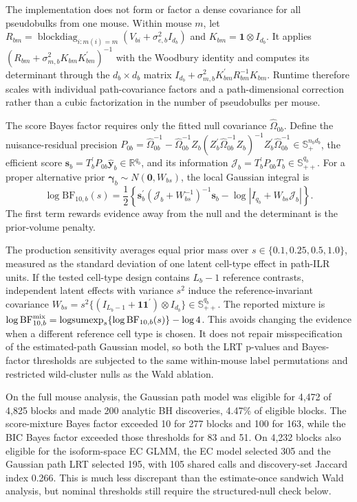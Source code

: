 \documentclass[11pt]{article}
\begin{document}
The implementation does not form or factor a dense covariance for all pseudobulks from one mouse. Within mouse \(m\), let \(R_{bm}=\operatorname{blockdiag}_{i:m(i)=m}(V_{bi}+\sigma_{e,b}^2I_{d_b})\) and \(K_{bm}=\bm1\otimes I_{d_b}\). It applies \((R_{bm}+\sigma_{m,b}^2K_{bm}K_{bm}^\prime)^{-1}\) with the Woodbury identity and computes its determinant through the \(d_b\times d_b\) matrix \(I_{d_b}+\sigma_{m,b}^2K_{bm}^\prime R_{bm}^{-1}K_{bm}\). Runtime therefore scales with individual path-covariance factors and a path-dimensional correction rather than a cubic factorization in the number of pseudobulks per mouse.

The score Bayes factor requires only the fitted null covariance \(\widehat\Omega_{0b}\). Define the nuisance-residual precision \(P_{0b}=\widehat\Omega_{0b}^{-1}-\widehat\Omega_{0b}^{-1}Z_b(Z_b^\prime\widehat\Omega_{0b}^{-1}Z_b)^{-1}Z_b^\prime\widehat\Omega_{0b}^{-1}\in\mathbb S_+^{n_bd_b}\), the efficient score \(\bm s_b=T_b^\prime P_{0b}\widehat{\bm y}_b\in\mathbb R^{q_b}\), and its information \(\mathcal J_b=T_b^\prime P_{0b}T_b\in\mathbb S_{++}^{q_b}\). For a proper alternative prior \(\bm\gamma_b\sim N(\bm0,W_{bs})\), the local Gaussian integral is \[\log\mathrm{BF}_{10,b}(s)=\frac12\left\{\bm s_b^\prime(\mathcal J_b+W_{bs}^{-1})^{-1}\bm s_b-\log|I_{q_b}+W_{bs}\mathcal J_b|\right\}.\] The first term rewards evidence away from the null and the determinant is the prior-volume penalty.

The production sensitivity averages equal prior mass over \(s\in\{0.1,0.25,0.5,1.0\}\), measured as the standard deviation of one latent cell-type effect in path-ILR units. If the tested cell-type design contains \(L_b-1\) reference contrasts, independent latent effects with variance \(s^2\) induce the reference-invariant covariance \(W_{bs}=s^2\{(I_{L_b-1}+\bm1\bm1^\prime)\otimes I_{d_b}\}\in\mathbb S_{++}^{q_b}\). The reported mixture is \(\log\mathrm{BF}^{\rm mix}_{10,b}=\operatorname{logsumexp}_s\{\log\mathrm{BF}_{10,b}(s)\}-\log4\). This avoids changing the evidence when a different reference cell type is chosen. It does not repair misspecification of the estimated-path Gaussian model, so both the LRT p-values and Bayes-factor thresholds are subjected to the same within-mouse label permutations and restricted wild-cluster nulls as the Wald ablation.

On the full mouse analysis, the Gaussian path model was eligible for 4,472 of 4,825 blocks and made 200 analytic BH discoveries, 4.47\% of eligible blocks. The score-mixture Bayes factor exceeded 10 for 277 blocks and 100 for 163, while the BIC Bayes factor exceeded those thresholds for 83 and 51. On 4,232 blocks also eligible for the isoform-space EC GLMM, the EC model selected 305 and the Gaussian path LRT selected 195, with 105 shared calls and discovery-set Jaccard index 0.266. This is much less discrepant than the estimate-once sandwich Wald analysis, but nominal thresholds still require the structured-null check below.
\end{document}
